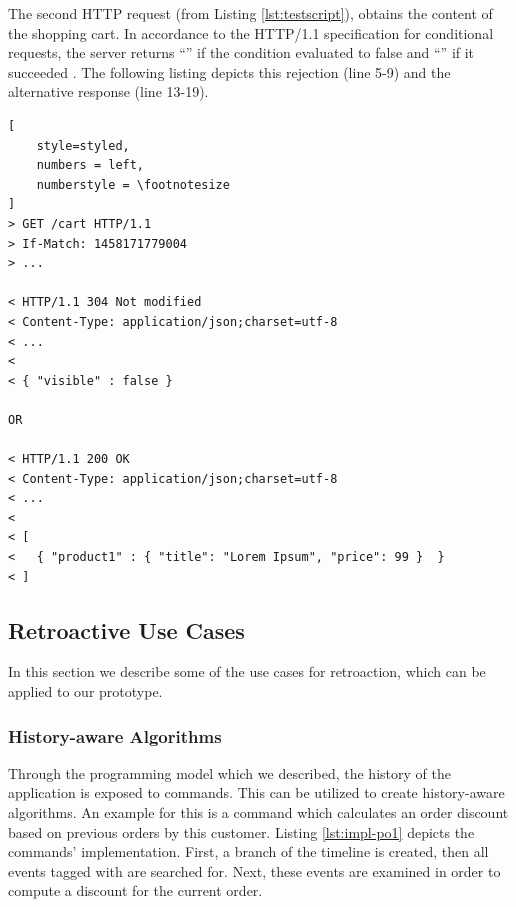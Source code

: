 The second HTTP request (from Listing \ref{lst:testscript}), obtains the content 
of the shopping cart. In accordance to the HTTP/1.1 specification for conditional 
requests, the server returns ``'' if the condition evaluated 
to false and ``'' if it succeeded \cite{RFC7232}.
The following listing depicts this rejection (line 5-9) and the alternative response 
(line 13-19).

\begin{lstlisting}[
	style=styled, 
	numbers = left,
	numberstyle = \footnotesize
]
> GET /cart HTTP/1.1
> If-Match: 1458171779004
> ...

< HTTP/1.1 304 Not modified
< Content-Type: application/json;charset=utf-8
< ...
<
< { "visible" : false }

OR

< HTTP/1.1 200 OK
< Content-Type: application/json;charset=utf-8
< ...
<
< [ 
< 	{ "product1" : { "title": "Lorem Ipsum", "price": 99 }  }
< ]
\end{lstlisting}


\subsection{Retroactive Use Cases}
In this section we describe some of the use cases for retroaction, which 
can be applied to our prototype. %

\subsubsection{History-aware Algorithms}
Through the programming model which we described, the history of the application 
is exposed to commands. This can be utilized to create history-aware algorithms.
An example for this is a  command which calculates an order 
discount based on previous orders by this customer. Listing \ref{lst:impl-po1}
depicts the commands' implementation.
First, a branch of the timeline is created, then all events tagged with 
 are searched for. Next, these events are examined in order 
to compute a discount for the current order.

